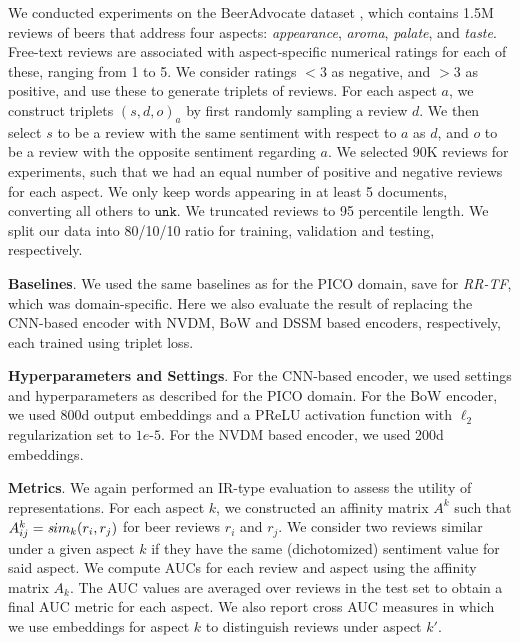 \documentclass[11pt,a4paper]{article}
\begin{document}
We conducted experiments on the BeerAdvocate dataset \cite{mcauley2012learning}, which contains 1.5M reviews of beers that address four aspects: \emph{appearance}, \emph{aroma}, \emph{palate}, and \emph{taste}. Free-text reviews are associated with aspect-specific numerical ratings for each of these, ranging from 1 to 5. We consider ratings $<3$ as negative, and $>3$ as positive, and use these to generate triplets of reviews. For each aspect $a$, we construct triplets $(s, d, o)_a$ by first randomly sampling a review $d$. We then select $s$ to be a review with the same sentiment with respect to $a$ as $d$, and $o$ to be a review with the opposite sentiment regarding $a$. We selected 90K reviews for experiments, such that we had an equal number of positive and negative reviews for each aspect. We only keep words appearing in at least 5 documents, converting all others to $\texttt{unk}$. We truncated reviews to 95 percentile length. We split our data into 80/10/10 ratio for training, validation and testing, respectively. %

\vspace{.25em}
\noindent \textbf{Baselines}. We used the same baselines as for the PICO domain, save for \emph{RR-TF}, which was domain-specific. Here we also evaluate the result of replacing the CNN-based encoder with NVDM, BoW and DSSM based encoders, respectively, each trained using triplet loss.%

\vspace{.25em}
\noindent  \textbf{Hyperparameters and Settings}. For the CNN-based encoder, we used settings and hyperparameters as described for the PICO domain. For the BoW encoder, we used 800d output embeddings and a PReLU activation function with $\ell_2$ regularization set to $1e$-$5$. For the NVDM based encoder, we used 200d embeddings. %

\vspace{.25em}
\noindent \textbf{Metrics}. We again performed an IR-type evaluation to assess the utility of representations. For each aspect $k$, we constructed an affinity matrix $A^k$ such that $A^k_{ij} = {\textit sim}_k(r_i, r_j)$ for beer reviews $r_i$ and $r_j$. We consider two reviews similar under a given aspect $k$ if they have the same (dichotomized) sentiment value for said aspect. We compute AUCs for each review and aspect using the affinity matrix $A_k$. The AUC values are averaged over reviews in the test set to obtain a final AUC metric for each aspect. We also report cross AUC measures in which we use embeddings for aspect $k$ to distinguish reviews under aspect $k'$. %
\end{document}
